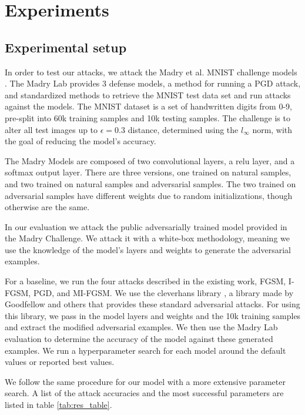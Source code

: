 \section{Experiments}
\subsection{Experimental setup}
In order to test our attacks, we attack the Madry et al. MNIST challenge models \cite{madry2017towards}. The Madry Lab provides 3 defense models, a method for running a PGD attack, and standardized methods to retrieve the MNIST test data set and run attacks against the models. The MNIST dataset is a set of handwritten digits from 0-9, pre-split into 60k training samples and 10k testing samples. The challenge is to alter all test images up to $\epsilon=0.3$ distance, determined using the $l_\infty$ norm, with the goal of reducing the model's accuracy.

The Madry Models are composed of two convolutional layers, a relu layer, and a softmax output layer. There are three versions, one trained on natural samples, and two trained on natural samples and adversarial samples. The two trained on adversarial samples have different weights due to random initializations, though otherwise are the same. 

In our evaluation we attack the public adversarially trained model provided in the Madry Challenge. We attack it with a white-box methodology, meaning we use the knowledge of the model's layers and weights to generate the adversarial examples.

For a baseline, we run the four attacks described in the existing work, FGSM, I-FGSM, PGD, and MI-FGSM. We use the cleverhans library \cite{GoodfellowPM16}, a library made by Goodfellow and others that provides these standard adversarial attacks. For using this library, we pass in the model layers and weights and the 10k training samples and extract the modified adversarial examples. We then use the Madry Lab evaluation to determine the accuracy of the model against these generated examples. We run a hyperparameter search for each model around the default values or reported best values.

We follow the same procedure for our model with a more extensive parameter search. A list of the attack accuracies and the most successful parameters are listed in table \ref{tab:res_table}.

